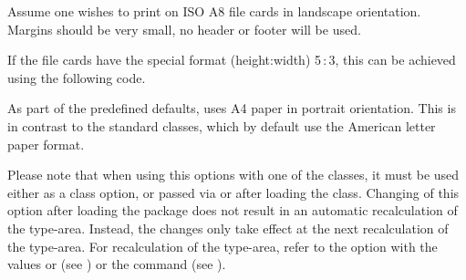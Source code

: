 \begin{Example}
 Assume one wishes to print on ISO A8 file cards in landscape
 orientation. Margins should be very small, no header or footer
 will be used.
If the file cards have the special format (height:width)
5\,:\,3, this can be achieved using the following
code.
\end{Example}

As part of the predefined defaults, {\KOMAScript} uses A4 paper in
portrait orientation. This is in contrast to the standard classes,
which by default use the American letter paper format.

Please note that when using this options with one of the {\KOMAScript}
classes, it must be used either as a class option, or passed via
 or  after loading the
class. Changing of this option after loading the 
package does not result in an automatic recalculation of the
type-area. Instead, the changes only take effect at the next
recalculation of the type-area. For recalculation of the type-area,
refer to the  option with the values  or
 (see ) or
the  command (see
).%
%
%

